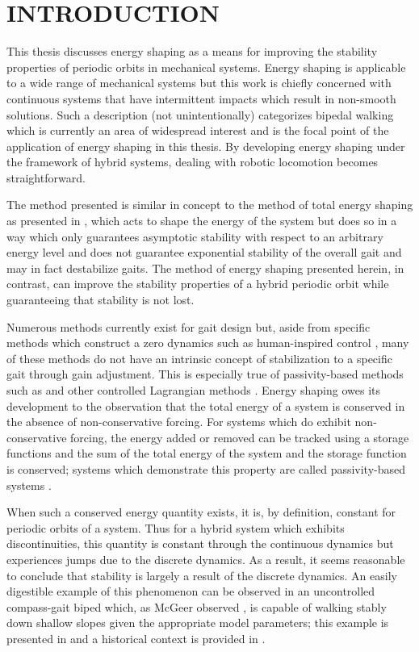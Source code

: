 \chapter{\uppercase{Introduction}}

This thesis discusses energy shaping as a means for improving the stability
properties of periodic orbits in mechanical systems.
%
Energy shaping is applicable to a wide range of mechanical systems but this work
is chiefly concerned with continuous systems that have intermittent impacts
\cite{Brogliato1996} which result in non-smooth solutions.
%
Such a description (not unintentionally) categorizes bipedal walking which is
currently an area of widespread interest and is the focal point of the
application of energy shaping in this thesis.
%
By developing energy shaping under the framework of hybrid systems, dealing with
robotic locomotion becomes straightforward.
%

The method presented is similar in concept to the method of total energy shaping
as presented in \cite{Spong2007}, which acts to shape the energy of the system
but does so in a way which only guarantees asymptotic stability with respect to
an arbitrary energy level and does not guarantee exponential stability of the
overall gait and may in fact destabilize gaits.
%
The method of energy shaping presented herein, in contrast, can improve the
stability properties of a hybrid periodic orbit while guaranteeing that
stability is not lost.
%


Numerous methods currently exist for gait design but, aside from specific
methods which construct a zero dynamics such as human-inspired control
\cite{Grizzle2014}, many of these methods do not have an intrinsic concept of
stabilization to a specific gait through gain adjustment.
%
This is especially true of passivity-based methods such as \csx \cite{Spong2005}
and other controlled Lagrangian methods \cite{Bloch2001,Bloch2000}.
%
Energy shaping owes its development to the observation that the total energy of
a system is conserved in the absence of non-conservative forcing.
%
For systems which do exhibit non-conservative forcing, the energy added or
removed can be tracked using a storage functions and the sum of the total energy
of the system and the storage function is conserved;
%
systems which demonstrate this property are called passivity-based systems
\cite{Spong2007}.
%

When such a conserved energy quantity exists, it is, by definition, constant for
periodic orbits of a system.
%
Thus for a hybrid system which exhibits discontinuities, this quantity is
constant through the continuous dynamics but experiences jumps due to the
discrete dynamics.
%
As a result, it seems reasonable to conclude that stability is largely a result
of the discrete dynamics.
%
An easily digestible example of this phenomenon can be observed in an
uncontrolled compass-gait biped which, as McGeer observed \cite{McGeer1990}, is
capable of walking stably down shallow slopes given the appropriate model
parameters;
%
this example is presented in  and a
historical context is provided in .

